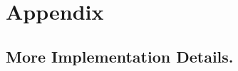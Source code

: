 ﻿\newpage
\newpage
\appendix
\onecolumn

\section{Appendix}

\subsection{More Implementation Details.}



